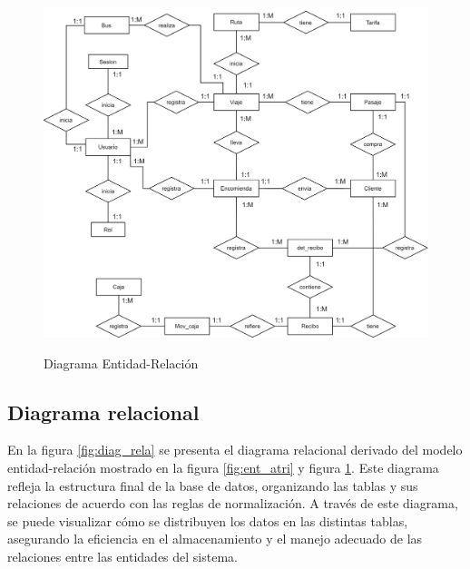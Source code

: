	\begin{figure}[!h] %
		\caption[Diagrama Entidad-Relación ]
		{\newline Diagrama Entidad-Relación} %
		\vspace{0.3cm}
		\centering
		\includegraphics[width=1\textwidth]{imagenes/cap_3/MER_cali.drawio_completo.png} %
		\vspace{0.3cm}
		\vspace{-0.8cm}
		\label{fig:MER_com} %
	\end{figure}
	
	\subsection{Diagrama relacional}
	En la figura \ref{fig:diag_rela} se presenta el diagrama relacional derivado del modelo entidad-relación mostrado en la figura \ref{fig:ent_atri} y figura \ref{fig:MER_com}. Este diagrama refleja la estructura final de la base de datos, organizando las tablas y sus relaciones de acuerdo con las reglas de normalización. A través de este diagrama, se puede visualizar cómo se distribuyen los datos en las distintas tablas, asegurando la eficiencia en el almacenamiento y el manejo adecuado de las relaciones entre las entidades del sistema.
	
